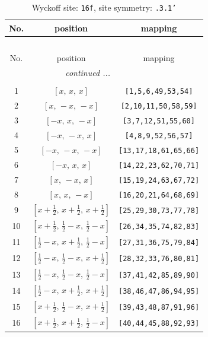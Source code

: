 \documentclass[fleqn,8pt]{jsarticle}
\begin{document}
\begin{longtable}{ccc}
\caption{Wyckoff site: {\tt 16f}, site symmetry: {\tt .3.1'}}
 \\
 \hline \hline
No. & position & mapping \\ \hline \endfirsthead

\multicolumn{2}{l}{\tablename\ \thetable{}} \\
 \hline \hline
No. & position & mapping \\ \hline \endhead

 \hline \hline
\multicolumn{2}{r}{\footnotesize\it continued ...} \\ \endfoot

 \hline \hline
\multicolumn{2}{r}{} \\ \endlastfoot

1 & $\left[ x,\, x,\, x \right]$ & {\tt [1,5,6,49,53,54]} \\ \hline
2 & $\left[ x,\, - x,\, - x \right]$ & {\tt [2,10,11,50,58,59]} \\ \hline
3 & $\left[ - x,\, x,\, - x \right]$ & {\tt [3,7,12,51,55,60]} \\ \hline
4 & $\left[ - x,\, - x,\, x \right]$ & {\tt [4,8,9,52,56,57]} \\ \hline
5 & $\left[ - x,\, - x,\, - x \right]$ & {\tt [13,17,18,61,65,66]} \\ \hline
6 & $\left[ - x,\, x,\, x \right]$ & {\tt [14,22,23,62,70,71]} \\ \hline
7 & $\left[ x,\, - x,\, x \right]$ & {\tt [15,19,24,63,67,72]} \\ \hline
8 & $\left[ x,\, x,\, - x \right]$ & {\tt [16,20,21,64,68,69]} \\ \hline
9 & $\left[ x + \frac{1}{2},\, x + \frac{1}{2},\, x + \frac{1}{2} \right]$ & {\tt [25,29,30,73,77,78]} \\ \hline
10 & $\left[ x + \frac{1}{2},\, \frac{1}{2} - x,\, \frac{1}{2} - x \right]$ & {\tt [26,34,35,74,82,83]} \\ \hline
11 & $\left[ \frac{1}{2} - x,\, x + \frac{1}{2},\, \frac{1}{2} - x \right]$ & {\tt [27,31,36,75,79,84]} \\ \hline
12 & $\left[ \frac{1}{2} - x,\, \frac{1}{2} - x,\, x + \frac{1}{2} \right]$ & {\tt [28,32,33,76,80,81]} \\ \hline
13 & $\left[ \frac{1}{2} - x,\, \frac{1}{2} - x,\, \frac{1}{2} - x \right]$ & {\tt [37,41,42,85,89,90]} \\ \hline
14 & $\left[ \frac{1}{2} - x,\, x + \frac{1}{2},\, x + \frac{1}{2} \right]$ & {\tt [38,46,47,86,94,95]} \\ \hline
15 & $\left[ x + \frac{1}{2},\, \frac{1}{2} - x,\, x + \frac{1}{2} \right]$ & {\tt [39,43,48,87,91,96]} \\ \hline
16 & $\left[ x + \frac{1}{2},\, x + \frac{1}{2},\, \frac{1}{2} - x \right]$ & {\tt [40,44,45,88,92,93]} \\
\end{longtable}
\end{document}
